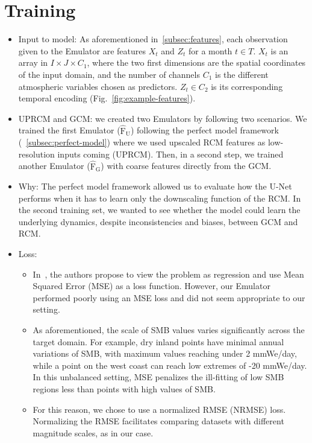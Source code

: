 \documentclass[a4paper,11pt,oneside]{report}
\begin{document}
\section{Training}\label{subsec:training}
\begin{itemize}
    \item Input to model: As aforementioned in~\ref{subsec:features}, each observation given to the Emulator are features $X_t$ and $Z_t$ for a month $t\in T$. $X_t$ is an array in $I \times J \times C_1$, where the two first dimensions are the spatial coordinates of the input domain, and the number of channels $C_1$ is the different atmospheric variables chosen as predictors. $Z_t \in C_2$ is its corresponding temporal encoding (Fig.~\ref{fig:example-features}).
    \item UPRCM and GCM: we created two Emulators by following two scenarios. We trained the first Emulator ($\operatorname{\hat{F}_U}$) following the perfect model framework (~\ref{subsec:perfect-model}) where we used upscaled RCM features as low-resolution inputs coming (UPRCM). Then, in a second step, we trained another Emulator ($\operatorname{\hat{F}_G}$) with coarse features directly from the GCM. 
    \item Why: The perfect model framework allowed us to evaluate how the U-Net performs when it has to learn only the downscaling function of the RCM. In the second training set, we wanted to see whether the model could learn the underlying dynamics, despite inconsistencies and biases, between GCM and RCM. 
    \item Loss: 
    \begin{itemize}
        \item In~\cite{Doury}, the authors propose to view the problem as regression and use Mean Squared Error (MSE) as a loss function. However, our Emulator performed poorly using an MSE loss and did not seem appropriate to our setting. 
        \item As aforementioned, the scale of SMB values varies significantly across the target domain. For example, dry inland points have minimal annual variations of SMB, with maximum values reaching under 2 \si{mmWe/day}, while a point on the west coast can reach low extremes of -20 \si{mmWe/day}. In this unbalanced setting, MSE penalizes the ill-fitting of low SMB regions less than points with high values of SMB.  
        \item For this reason, we chose to use a normalized RMSE (NRMSE) loss. Normalizing the RMSE facilitates comparing datasets with different magnitude scales, as in our case. 

\end{itemize}
\end{itemize}
\end{document}
